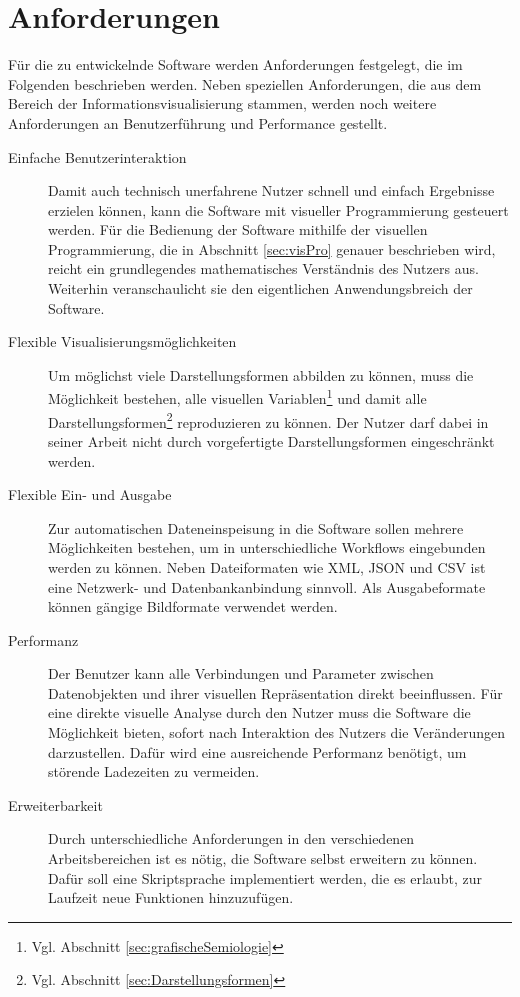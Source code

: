 \documentclass[a4paper, 
               12pt,
               DIV=calc,
               version=first,
               pdftex,
               headsepline,
               footsepline,
               bibtotocnumbered,
               liststotocnumbered]{scrreprt}
\begin{document}
\section{Anforderungen}
\label{sec:Anforderungen}
Für die zu entwickelnde Software werden Anforderungen festgelegt, die
im Folgenden beschrieben werden. Neben speziellen Anforderungen, die aus
dem Bereich der Informationsvisualisierung stammen, werden noch weitere
Anforderungen an Benutzerführung und Performance gestellt.
\begin{description}
\item[Einfache Benutzerinteraktion]
Damit auch technisch unerfahrene Nutzer schnell und einfach Ergebnisse erzielen können, kann die Software
mit visueller Programmierung gesteuert werden. Für die Bedienung der Software mithilfe der visuellen
Programmierung, die in Abschnitt \ref{sec:visPro} genauer beschrieben wird,
reicht ein grundlegendes mathematisches Verständnis des Nutzers aus.
Weiterhin veranschaulicht sie den eigentlichen Anwendungsbreich der Software.
\item[Flexible Visualisierungsmöglichkeiten]
Um möglichst viele Darstellungsformen abbilden zu können, muss die 
Möglichkeit bestehen, alle visuellen Variablen\footnote{Vgl. Abschnitt
\ref{sec:grafischeSemiologie}} und damit alle Darstellungsformen\footnote{Vgl. Abschnitt
\ref{sec:Darstellungsformen}} reproduzieren zu können. Der Nutzer darf dabei
in seiner Arbeit nicht durch vorgefertigte Darstellungsformen
eingeschränkt werden.
\item[Flexible Ein- und Ausgabe]
Zur automatischen Dateneinspeisung in die Software sollen mehrere Möglichkeiten
bestehen, um in unterschiedliche Workflows eingebunden werden zu können.
Neben Dateiformaten wie XML, JSON und CSV ist eine Netzwerk- und
Datenbankanbindung sinnvoll. Als Ausgabeformate können gängige Bildformate
verwendet werden.
\item[Performanz]
Der Benutzer kann alle Verbindungen und Parameter zwischen Datenobjekten und ihrer
visuellen Repräsentation direkt beeinflussen. Für eine direkte visuelle Analyse
durch den Nutzer muss die Software die Möglichkeit bieten, sofort
nach Interaktion des Nutzers die Veränderungen darzustellen. Dafür wird eine
ausreichende Performanz benötigt, um störende Ladezeiten zu vermeiden.
\item[Erweiterbarkeit]
Durch unterschiedliche Anforderungen in den verschiedenen Arbeitsbereichen ist
es nötig, die Software selbst erweitern zu können. Dafür soll eine Skriptsprache
implementiert werden, die es erlaubt, zur Laufzeit neue Funktionen hinzuzufügen.

\end{description}
\end{document}
